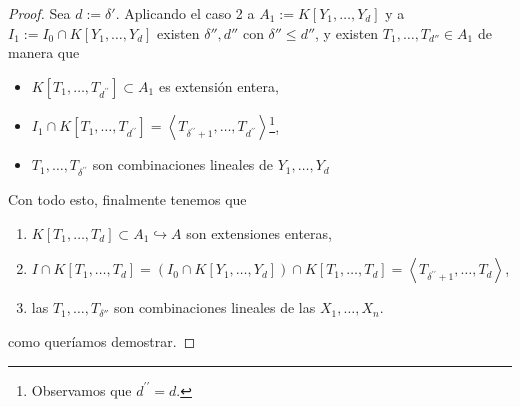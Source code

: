\documentclass[../main.tex]{subfiles}
\begin{document}
\begin{proof}
Sea $d:=\delta'$. Aplicando el caso 2 a $A_{1}:=K\left[Y_{1}, \ldots, Y_{d}\right]$ y a $I_{1}:=I_{0} \cap K[Y_{1}, \ldots, Y_{d}]$ existen $\delta'', d''$ con $\delta'' \leq d''$, y existen $T_1, \dots, T_{d''} \in A_{1}$ de manera que
\begin{itemize}
  \item $K\left[T_{1}, \ldots, T_{d^{\prime \prime}}\right] \subset A_{1}$ es extensión entera,
  \item $I_{1} \cap K\left[T_{1}, \ldots, T_{d^{\prime \prime}}\right]=\left\langle T_{\delta^{\prime \prime}+1}, \ldots, T_{d^{\prime \prime}}\right\rangle$\footnote{Observamos que $d^{\prime \prime}=d$.},
  \item $T_{1}, \ldots, T_{\delta^{\prime \prime}}$ son combinaciones lineales de $Y_{1}, \ldots, Y_{d}$
\end{itemize}

Con todo esto, finalmente tenemos que
\begin{enumerate}
  \item  $K\left[T_{1}, \ldots, T_{d}\right] \subset A_{1} \hookrightarrow A$ son extensiones enteras,
  \item  $I \cap K\left[T_{1}, \ldots, T_{d}\right]=\left(I_{0} \cap K\left[Y_{1}, \ldots, Y_{d}\right]\right) \cap K\left[T_{1}, \ldots, T_{d}\right]=\left\langle T_{\delta^{\prime \prime}+1}, \ldots, T_{d}\right\rangle$,
  \item las $T_1, \dots, T_{\delta''}$ son combinaciones lineales de las $X_1, \dots, X_n$.
\end{enumerate}
como queríamos demostrar.
\end{proof}
\end{document}
